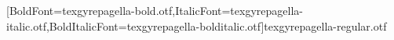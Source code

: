\usepackage{longtable,booktabs,array}
\usepackage{multirow}
\usepackage{tikz}
\usepackage{calc} %
\usepackage{etoolbox}
\makeatletter
\patchcmd\longtable{\par}{\if@noskipsec\mbox{}\fi\par}{}{}
\makeatother
\usepackage{graphicx}
\makeatletter
\newsavebox\pandoc@box
\newcommand*\nbcpbounded[1]{%
  \sbox\pandoc@box{#1}%
  \Gscale@div\@tempa{\textheight}{\dimexpr\ht\pandoc@box+\dp\pandoc@box\relax}%
  \Gscale@div\@tempb{\linewidth}{\wd\pandoc@box}%
  \ifdim\@tempb\p@<\@tempa\p@\let\@tempa\@tempb\fi%
  \ifdim\@tempa\p@<\p@\scalebox{\@tempa}{\usebox\pandoc@box}%
  \else\usebox{\pandoc@box}%
  \fi%
}
\def\fps@figure{htbp}
\makeatother



\ifLuaTeX
\usepackage[bidi=basic]{babel}
\else
\usepackage[bidi=default]{babel}
\fi
\ifPDFTeX
\else
{}[BoldFont=texgyrepagella-bold.otf,ItalicFont=texgyrepagella-italic.otf,BoldItalicFont=texgyrepagella-bolditalic.otf]{texgyrepagella-regular.otf}
\fi
\let\LanguageShortHands\languageshorthands
\def\languageshorthands#1{}
\ifLuaTeX
  \usepackage[english]{selnolig} %
\fi


\setlength{\emergencystretch}{3em} %

\providecommand{\tightlist}{%
  \setlength{\itemsep}{0pt}\setlength{\parskip}{0pt}}



 


